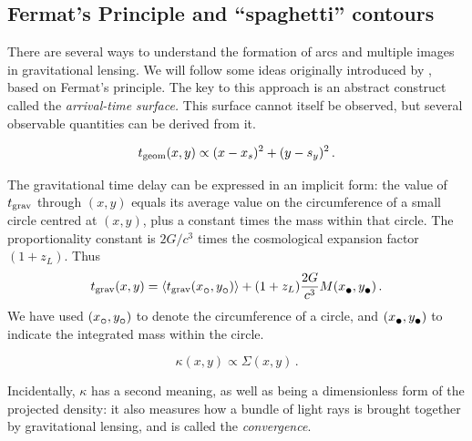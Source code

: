 \subsection{Fermat's Principle and ``spaghetti'' contours} \label{sec:Fermat}

There are several ways to understand the formation of arcs and
multiple images in gravitational lensing.  We will follow some ideas
originally introduced by \cite{1986ApJ...310..568B}, based on Fermat's
principle.  The key to this approach is an abstract construct called
the {\em arrival-time surface.}  This surface cannot itself be
observed, but several observable quantities can be derived from it.

\begin{equation} \label{eq:tgeom}
t_{\rm geom}(x,y) \propto (x-x_s)^2 + (y-s_y)^2 \,.
\end{equation}

The gravitational time delay can be expressed in an implicit form: the
value of $t_{\rm grav}$ through $(x,y)$ equals its average value on the
circumference of a small circle centred at $(x,y)$, plus a constant
times the mass within that circle.  The proportionality constant is
$2G/c^3$ times the cosmological expansion factor $(1+z_L)$. Thus
\begin{equation} \label{eq:tgrav}
\tgrav(x,y) = \left\langle \tgrav(x_\subcirc,y_\subcirc) \right\rangle
              + (1+z_L) \frac{2G}{c^3} M(x_\subbullet,y_\subbullet) \,.
\end{equation}
We have used $(x_\subcirc,y_\subcirc)$ to denote the circumference of
a circle, and $(x_\subbullet,y_\subbullet)$ to indicate the integrated
mass within the circle.

\begin{equation} \label{eq:kappa}
\kappa(x,y) \propto \Sigma(x,y) \,.
\end{equation}

Incidentally, $\kappa$ has a second meaning, as well as
being a dimensionless form of the projected density: it also
measures how a bundle of light rays is brought together by
gravitational lensing, and is called the {\em convergence}.

